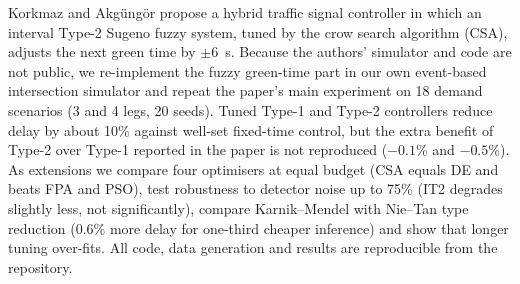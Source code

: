 Korkmaz and Akg{\"u}ng{\"o}r \cite{ref_paper} propose a hybrid traffic signal controller in which an interval Type-2 Sugeno fuzzy system, tuned by the crow search algorithm (CSA), adjusts the next green time by $\pm6$~s. Because the authors' simulator and code are not public, we re-implement the fuzzy green-time part in our own event-based intersection simulator and repeat the paper's main experiment on 18 demand scenarios (3 and 4 legs, 20 seeds). Tuned Type-1 and Type-2 controllers reduce delay by about 10\% against well-set fixed-time control, but the extra benefit of Type-2 over Type-1 reported in the paper is not reproduced ($-0.1$\% and $-0.5$\%). As extensions we compare four optimisers at equal budget (CSA equals DE and beats FPA and PSO), test robustness to detector noise up to 75\% (IT2 degrades slightly less, not significantly), compare Karnik--Mendel with Nie--Tan type reduction (0.6\% more delay for one-third cheaper inference) and show that longer tuning over-fits. All code, data generation and results are reproducible from the repository.

